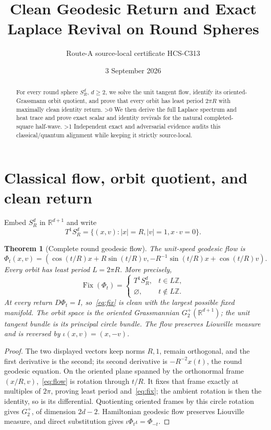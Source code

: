 \documentclass[10pt]{article}
\title{Clean Geodesic Return and Exact Laplace Revival on Round Spheres}
\author{Route-A source-local certificate HCS-C313}
\date{3 September 2026}
\providecommand{\CRevisionRound}{2}
\newtheorem{theorem}{Theorem}
\newcommand{\Fix}{\operatorname{Fix}}\newcommand{\Tr}{\operatorname{Tr}}
\begin{document}
\maketitle
\begin{abstract}
For every round sphere $S_R^d$, $d\ge2$, we solve the unit tangent flow,
identify its oriented-Grassmann orbit quotient, and prove that every orbit
has least period $2\pi R$ with maximally clean identity return.
\ifnum\CRevisionRound>0
We then derive the full Laplace spectrum and heat trace and prove exact
scalar and identity revivals for the natural completed-square half-wave.
\fi
\ifnum\CRevisionRound>1
Independent exact and adversarial evidence audits this classical/quantum
alignment while keeping it strictly source-local.
\fi
\end{abstract}

\section{Classical flow, orbit quotient, and clean return}
Embed $S_R^d$ in $\mathbb R^{d+1}$ and write
\[
T^1S_R^d=\{(x,v):|x|=R, |v|=1, x\cdot v=0\}.
\]
\begin{theorem}[Complete round geodesic flow]\label{thm:flow}
The unit-speed geodesic flow is
\begin{equation}\label{eq:flow}
 \Phi_t(x,v)=\left(\cos(t/R)x+R\sin(t/R)v,
 -R^{-1}\sin(t/R)x+\cos(t/R)v\right).
\end{equation}
Every orbit has least period $L=2\pi R$.  More precisely,
\begin{equation}\label{eq:fix}
 \Fix(\Phi_t)=\begin{cases}T^1S_R^d,&t\in L\mathbb Z,\\
 \varnothing,&t\notin L\mathbb Z.
 \end{cases}
\end{equation}
At every return $D\Phi_t=I$, so~\eqref{eq:fix} is clean with the largest
possible fixed manifold.  The orbit space is the oriented Grassmannian
$G_2^+(\mathbb R^{d+1})$; the unit tangent bundle is its principal circle
bundle.  The flow preserves Liouville measure and is reversed by
$\iota(x,v)=(x,-v)$.
\end{theorem}
\begin{proof}
The two displayed vectors keep norms $R,1$, remain orthogonal, and the first
derivative is the second; its second derivative is $-R^{-2}x(t)$, the round
geodesic equation.  On the oriented plane spanned by the orthonormal frame
$(x/R,v)$,~\eqref{eq:flow} is rotation through $t/R$.  It fixes that frame
exactly at multiples of $2\pi$, proving least period and~\eqref{eq:fix}; the
ambient rotation is then the identity, so is its differential.  Quotienting
oriented frames by this circle rotation gives $G_2^+$, of dimension $2d-2$.
Hamiltonian geodesic flow preserves Liouville measure, and direct substitution
gives $\iota\Phi_t\iota=\Phi_{-t}$.
\end{proof}
\end{document}
